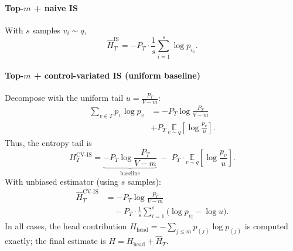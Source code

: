 \documentclass[11pt]{article}
\begin{document}
\paragraph{Top-$m$ + naive IS} With $s$ samples $v_i\!\sim q$,
\[
	\widehat{H}_T^{\text{IS}}
	= -P_T \cdot \frac{1}{s}\sum_{i=1}^s \log p_{v_i}.
\]
\paragraph{Top-$m$ + control-variated IS (uniform baseline)}
Decompose with the uniform tail $u=\tfrac{P_T}{V-m}$:
\begin{align*}
	\sum_{v\in T} p_v \log p_v
	 & = -P_T\log\!\frac{P_T}{V-m}                                               \\
	 & + P_T\,\underset{v\sim q}{\mathbb{E}}\!\left[\log\!\frac{p_v}{u}\right].
\end{align*}
Thus, the entropy tail is
\[
	H_T^{\text{CV-IS}}
	= \underbrace{-P_T\log\!\frac{P_T}{V-m}}_{\text{baseline}}
	\;-\; P_T \cdot \underset{v\sim q}{\mathbb{E}}\!\left[\log\!\frac{p_v}{u}\right].
\]
With unbiased estimator (using $s$ samples):
\begin{align*}
	\widehat{H}_T^{\text{CV-IS}}
	 & = -P_T\log\!\frac{P_T}{V-m}                                                 \\
	 & \quad - P_T \cdot \frac{1}{s}\sum_{i=1}^s \Big(\log p_{v_i} - \log u\Big).
\end{align*}
In all cases, the head contribution $H_{\text{head}}=-\sum_{j\le m}p_{(j)}\log p_{(j)}$ is computed exactly; the final estimate is $H=H_{\text{head}}+\widehat{H}_T$.
\end{document}
